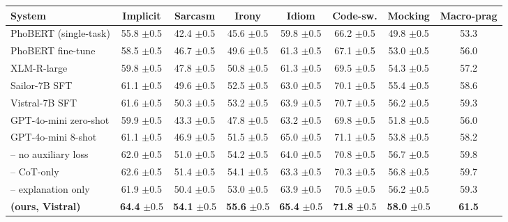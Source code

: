 \begin{table}[t]
\centering
\footnotesize
\begin{tabular}{@{}l c c c c c c c@{}}
\toprule
System & Implicit & Sarcasm & Irony & Idiom & Code-sw. & Mocking & Macro-prag \\
\midrule
PhoBERT (single-task)             & 55.8 \tiny{$\pm$0.5} & 42.4 \tiny{$\pm$0.5} & 45.6 \tiny{$\pm$0.5} & 59.8 \tiny{$\pm$0.5} & 66.2 \tiny{$\pm$0.5} & 49.8 \tiny{$\pm$0.5} & 53.3 \\
PhoBERT fine-tune                 & 58.5 \tiny{$\pm$0.5} & 46.7 \tiny{$\pm$0.5} & 49.6 \tiny{$\pm$0.5} & 61.3 \tiny{$\pm$0.5} & 67.1 \tiny{$\pm$0.5} & 53.0 \tiny{$\pm$0.5} & 56.0 \\
XLM-R-large \citep{conneau2020xlmr} & 59.8 \tiny{$\pm$0.5} & 47.8 \tiny{$\pm$0.5} & 50.8 \tiny{$\pm$0.5} & 61.3 \tiny{$\pm$0.5} & 69.5 \tiny{$\pm$0.5} & 54.3 \tiny{$\pm$0.5} & 57.2 \\
Sailor-7B SFT \citep{sailor2024}  & 61.1 \tiny{$\pm$0.5} & 49.6 \tiny{$\pm$0.5} & 52.5 \tiny{$\pm$0.5} & 63.0 \tiny{$\pm$0.5} & 70.1 \tiny{$\pm$0.5} & 55.4 \tiny{$\pm$0.5} & 58.6 \\
Vistral-7B SFT \citep{vistral2024}& 61.6 \tiny{$\pm$0.5} & 50.3 \tiny{$\pm$0.5} & 53.2 \tiny{$\pm$0.5} & 63.9 \tiny{$\pm$0.5} & 70.7 \tiny{$\pm$0.5} & 56.2 \tiny{$\pm$0.5} & 59.3 \\
GPT-4o-mini zero-shot \citep{openai2024gpt4o}    & 59.9 \tiny{$\pm$0.5} & 43.3 \tiny{$\pm$0.5} & 47.8 \tiny{$\pm$0.5} & 63.2 \tiny{$\pm$0.5} & 69.8 \tiny{$\pm$0.5} & 51.8 \tiny{$\pm$0.5} & 56.0 \\
GPT-4o-mini 8-shot                & 61.1 \tiny{$\pm$0.5} & 46.9 \tiny{$\pm$0.5} & 51.5 \tiny{$\pm$0.5} & 65.0 \tiny{$\pm$0.5} & 71.1 \tiny{$\pm$0.5} & 53.8 \tiny{$\pm$0.5} & 58.2 \\
\midrule
\method{} -- no auxiliary loss    & 62.0 \tiny{$\pm$0.5} & 51.0 \tiny{$\pm$0.5} & 54.2 \tiny{$\pm$0.5} & 64.0 \tiny{$\pm$0.5} & 70.8 \tiny{$\pm$0.5} & 56.7 \tiny{$\pm$0.5} & 59.8 \\
\method{} -- CoT-only             & 62.6 \tiny{$\pm$0.5} & 51.4 \tiny{$\pm$0.5} & 54.1 \tiny{$\pm$0.5} & 63.3 \tiny{$\pm$0.5} & 70.3 \tiny{$\pm$0.5} & 56.8 \tiny{$\pm$0.5} & 59.7 \\
\method{} -- explanation only     & 61.9 \tiny{$\pm$0.5} & 50.4 \tiny{$\pm$0.5} & 53.0 \tiny{$\pm$0.5} & 63.9 \tiny{$\pm$0.5} & 70.5 \tiny{$\pm$0.5} & 56.2 \tiny{$\pm$0.5} & 59.3 \\
\textbf{\method{} (ours, Vistral)}& \textbf{64.4} \tiny{$\pm$0.5} & \textbf{54.1} \tiny{$\pm$0.5} & \textbf{55.6} \tiny{$\pm$0.5} & \textbf{65.4} \tiny{$\pm$0.5} & \textbf{71.8} \tiny{$\pm$0.5} & \textbf{58.0} \tiny{$\pm$0.5} & \textbf{61.5} \\

\end{tabular}
\end{table}
